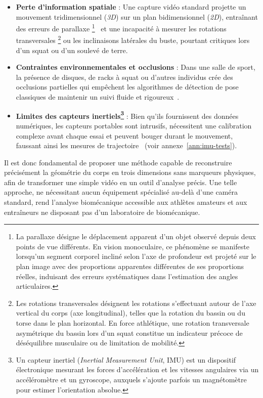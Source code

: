 \begin{itemize}
  \item \textbf{Perte d'information spatiale} : Une capture vidéo standard projette un mouvement tridimensionnel (\textit{3D}) sur un plan bidimensionnel (\textit{2D}), entraînant des erreurs de parallaxe \footnote{La parallaxe désigne le déplacement apparent d'un objet observé depuis deux points de vue différents. En vision monoculaire, ce phénomène se manifeste lorsqu'un segment corporel incliné selon l'axe de profondeur est projeté sur le plan image avec des proportions apparentes différentes de ses proportions réelles, induisant des erreurs systématiques dans l'estimation des angles articulaires.}~\cite{Hartley2003} et une incapacité à mesurer les rotations transversales \footnote{Les rotations transversales désignent les rotations s'effectuant autour de l'axe vertical du corps (axe longitudinal), telles que la rotation du bassin ou du torse dans le plan horizontal. En force athlétique, une rotation transversale asymétrique du bassin lors d'un squat constitue un indicateur précoce de déséquilibre musculaire ou de limitation de mobilité.} ou les inclinaisons latérales du buste, pourtant critiques lors d'un squat ou d'un soulevé de terre.
  \item \textbf{Contraintes environnementales et occlusions} : Dans une salle de sport, la présence de disques, de racks à squat ou d'autres individus crée des occlusions partielles qui empêchent les algorithmes de détection de pose classiques de maintenir un suivi fluide et rigoureux~\cite{OpenPose-2019}.
  \item \textbf{Limites des capteurs inertiels\footnote{Un capteur inertiel (\emph{Inertial Measurement Unit}, IMU) est un dispositif électronique mesurant les forces d'accélération et les vitesses angulaires via un accéléromètre et un gyroscope, auxquels s'ajoute parfois un magnétomètre pour estimer l'orientation absolue.}} : Bien qu'ils fournissent des données numériques, les capteurs portables sont intrusifs, nécessitent une calibration complexe avant chaque essai et peuvent bouger durant le mouvement, faussant ainsi les mesures de trajectoire~\cite{Roetenberg2009, Camomilla2018} (voir annexe~\ref{ann:imu-tests}).
\end{itemize}

Il est donc fondamental de proposer une méthode capable de reconstruire précisément la géométrie du corps en trois dimensions sans marqueurs physiques, afin de transformer une simple vidéo en un outil d'analyse précis. Une telle approche, ne nécessitant aucun équipement spécialisé au-delà d'une caméra standard, rend l'analyse biomécanique accessible aux athlètes amateurs et aux entraîneurs ne disposant pas d'un laboratoire de biomécanique.

